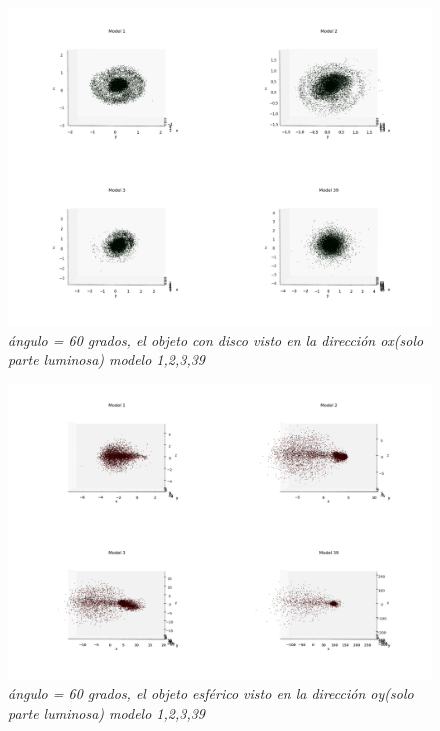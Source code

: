 \documentclass[12pt]{article} %
\renewcommand{\=}[1]{\stackrel{#1}{=}} %
\theoremstyle{definition}
\theoremstyle{remark}
\begin{document}
\begin{figure}[!ht]
 \centering
 \includegraphics[scale=0.2]{60deg-m-c2.png}
 \caption{\emph{ ángulo = 60 grados, el objeto con disco visto en la dirección ox(solo parte luminosa) modelo 1,2,3,39 }}
\end{figure}

\begin{figure}[!ht]
 \centering
 \includegraphics[scale=0.2]{sep5-60deg-eoy.png}
 \caption{\emph{ ángulo = 60 grados, el objeto esférico visto en la dirección oy(solo parte luminosa) modelo 1,2,3,39 }}
\end{figure}
\end{document}
